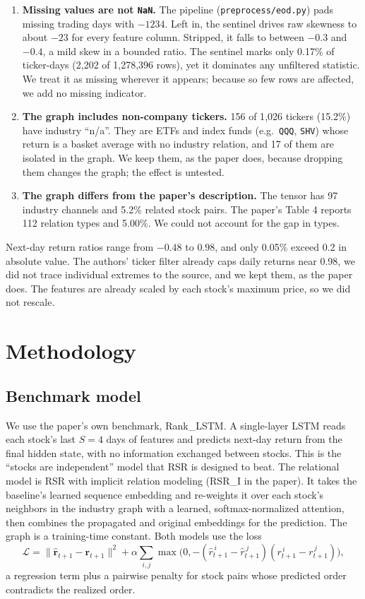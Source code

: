 \documentclass[12pt]{article}
\begin{document}
\begin{enumerate}
  \item \textbf{Missing values are not \texttt{NaN}.} The pipeline (\texttt{preprocess/eod.py})
  pads missing trading days with $-1234$. Left in, the sentinel drives raw skewness to about
  $-23$ for every feature column. Stripped, it falls to between $-0.3$ and $-0.4$, a
  mild skew in a bounded ratio. The sentinel marks only 0.17\% of ticker-days (2{,}202 of
  1{,}278{,}396 rows), yet it dominates any unfiltered statistic. We treat it as missing
  wherever it appears; because so few rows are affected, we add no missing indicator.
  \item \textbf{The graph includes non-company tickers.} 156 of 1{,}026 tickers (15.2\%) have
  industry ``n/a''. They are ETFs and index funds (e.g.\ \texttt{QQQ}, \texttt{SHV}) whose
  return is a basket average with no industry relation, and 17 of them are isolated in the
  graph. We keep them, as the paper does, because dropping them changes the graph; the effect is
  untested.
  \item \textbf{The graph differs from the paper's description.} The tensor has 97 industry
  channels and 5.2\% related stock pairs. The paper's Table 4 reports 112 relation types and
  5.00\%. We could not account for the gap in types.
\end{enumerate}

Next-day return ratios range from $-0.48$ to $0.98$, and only 0.05\% exceed 0.2 in absolute
value. The authors' ticker filter already caps daily returns near 0.98, we did not trace
individual extremes to the source, and we kept them, as the paper does. The features are already
scaled by each stock's maximum price, so we did not rescale.


\section{Methodology}
\label{sec:methods}

\subsection{Benchmark model}

We use the paper's own benchmark, Rank\_LSTM. A single-layer LSTM reads each stock's last
$S=4$ days of features and predicts next-day return from the final hidden state, with no
information exchanged between stocks. This is the ``stocks are independent'' model that RSR is
designed to beat. The relational model is RSR with implicit relation modeling (RSR\_I in the
paper). It takes the baseline's learned sequence embedding and re-weights it over each stock's
neighbors in the industry graph with a learned, softmax-normalized attention, then combines the
propagated and original embeddings for the prediction. The graph is a training-time constant.
Both models use the loss
\[
\mathcal{L} = \lVert \hat{\mathbf r}_{t+1}-\mathbf r_{t+1}\rVert^2
 + \alpha\sum_{i,j}\max\bigl(0,-(\hat r^{\,i}_{t+1}-\hat r^{\,j}_{t+1})(r^{\,i}_{t+1}-r^{\,j}_{t+1})\bigr),
\]
a regression term plus a pairwise penalty for stock pairs whose predicted order contradicts the
realized order.
\end{document}
